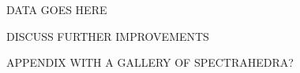 \documentclass[12pt]{amsart}
\theoremstyle{plain}
\theoremstyle{definition}
\begin{document}
DATA GOES HERE


DISCUSS FURTHER IMPROVEMENTS

APPENDIX WITH A GALLERY OF SPECTRAHEDRA?




\nocite{*}
\end{document}
